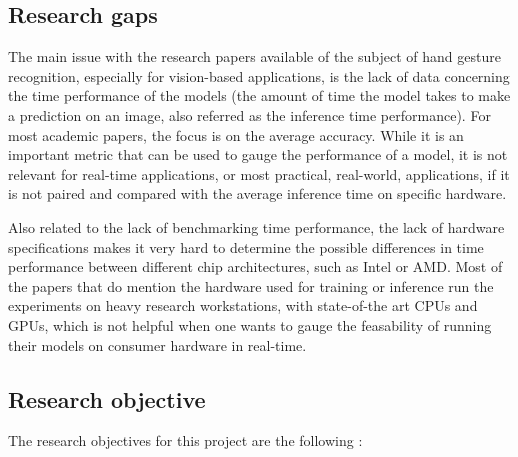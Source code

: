 \documentclass[12pt]{article}
\begin{document}
\subsection{Research gaps}

The main issue with the research papers available of the subject of hand gesture recognition, especially for vision-based applications, is the lack of data concerning the time performance of the models (the amount of time the model takes to make a prediction on an image, also referred as the inference time performance). For most academic papers, the focus is on the average accuracy. While it is an important metric that can be used to gauge the performance of a model, it is not relevant for real-time applications, or most practical, real-world, applications, if it is not paired and compared with the average inference time on specific hardware.

Also related to the lack of benchmarking time performance, the lack of hardware specifications makes it very hard to determine the possible differences in time performance between different chip architectures, such as Intel or AMD. Most of the papers that do mention the hardware used for training or inference run the experiments on heavy research workstations, with state-of-the art CPUs and GPUs, which is not helpful when one wants to gauge the feasability of running their models on consumer hardware in real-time.

\subsection{Research objective}
The research objectives for this project are the following :
\end{document}
